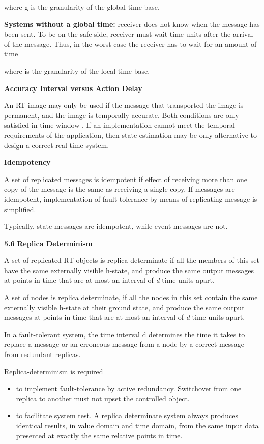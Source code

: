 where g is the granularity of the global time-base.

\textbf{Systems without a global time:} receiver does not know when the
message has been sent. To be on the safe side, receiver must wait time
units after the arrival of the message. Thus, in the worst case the
receiver has to wait for an amount of time

where is the granularity of the local time-base.

\textbf{Accuracy Interval versus Action Delay}

An RT image may only be used if the message that transported the image
is permanent, and the image is temporally accurate. Both conditions are
only satisfied in time window . If an implementation cannot meet the
temporal requirements of the application, then state estimation may be
only alternative to design a correct real-time system.

\textbf{Idempotency}

A set of replicated messages is idempotent if effect of receiving more
than one copy of the message is the same as receiving a single copy. If
messages are idempotent, implementation of fault tolerance by means of
replicating message is simplified.

Typically, state messages are idempotent, while event messages are not.

\textbf{5.6} \protect\hypertarget{teil7}{}{}\textbf{Replica Determinism}

A set of replicated RT objects is replica-determinate if all the members
of this set have the same externally visible h-state, and produce the
same output messages at points in time that are at most an interval of
\emph{d} time units apart.

A set of nodes is replica determinate, if all the nodes in this set
contain the same externally visible h-state at their ground state, and
produce the same output messages at points in time that are at most an
interval of \emph{d} time units apart.

In a fault-tolerant system, the time interval d determines the time it
takes to replace a message or an erroneous message from a node by a
correct message from redundant replicas.

Replica-determinism is required

\begin{itemize}
\item
  to implement fault-tolerance by active redundancy. Switchover from one
  replica to another must not upset the controlled object.
\item
  to facilitate system test. A replica determinate system always
  produces identical results, in value domain and time domain, from the
  same input data presented at exactly the same relative points in time.
\end{itemize}

